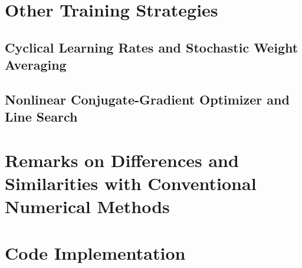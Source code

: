\section{Other Training Strategies}


    \subsection{Cyclical Learning Rates and Stochastic Weight Averaging}\label{sec:cyclic-swa}
    

    \subsection{Nonlinear Conjugate-Gradient Optimizer and Line Search}\label{sec:ncg}
    

\section{Remarks on Differences and Similarities with Conventional Numerical Methods}\label{sec:pinn-diff}


\section{Code Implementation}\label{sec:pinn-code-impl}

